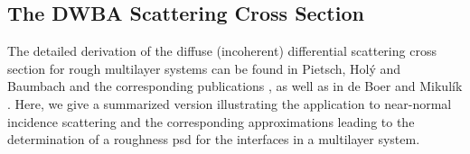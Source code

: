 


\subsection{The DWBA Scattering Cross Section}
The detailed derivation of the diffuse (incoherent) differential scattering cross section for rough multilayer systems can be found in Pietsch, Hol\'{y} and Baumbach \cite{pietsch_high-resolution_2004} and the corresponding publications \cite{sinha_x-ray_1988,holy_nonspecular_1994}, as well as in de Boer \cite{de_boer_x-ray_1996} and Mikul\'{i}k \cite{mikulik_x-ray_1997}. Here, we give a summarized version illustrating the application to near-normal incidence scattering and the corresponding approximations leading to the determination of a roughness \gls{psd} for the interfaces in a multilayer system.

